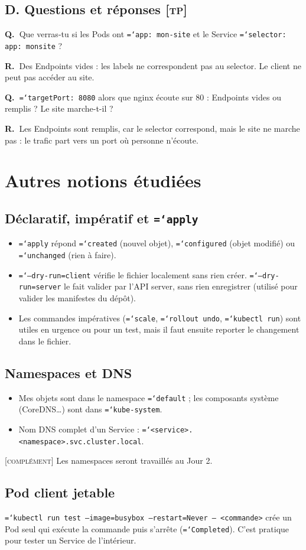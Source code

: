 \documentclass[11pt,a4paper]{article}
\newcommand{\cmd}[1]{\texttt{\hyphenchar\font=`\-#1}}
\newcommand{\tp}{\textsc{[tp]}}
\newcommand{\compl}{\textsc{[complément]}}
\newcommand{\QR}[2]{\needspace{4\baselineskip}\par\noindent\textbf{Q.~}#1\par\nopagebreak\noindent\textbf{R.~}#2\par\medskip}
\newcommand{\partie}[1]{\needspace{9\baselineskip}\subsection*{#1}}
\begin{document}
\partie{D. Questions et réponses \tp}
\QR{Que verras-tu si les Pods ont \cmd{app: mon-site} et le Service \cmd{selector: app: monsite} ?}{Des Endpoints vides : les labels ne correspondent pas au selector. Le client ne peut pas accéder au site.}
\QR{\cmd{targetPort: 8080} alors que nginx écoute sur 80 : Endpoints vides ou remplis ? Le site marche-t-il ?}{Les Endpoints sont remplis, car le selector correspond, mais le site ne marche pas : le trafic part vers un port où personne n'écoute.}

\section{Autres notions étudiées}

\subsection{Déclaratif, impératif et \cmd{apply}}
\begin{itemize}
  \item \cmd{apply} répond \cmd{created} (nouvel objet), \cmd{configured} (objet modifié) ou \cmd{unchanged} (rien à faire).
  \item \cmd{--dry-run=client} vérifie le fichier localement sans rien créer. \cmd{--dry-run=server} le fait valider par l'API server, sans rien enregistrer (utilisé pour valider les manifestes du dépôt).
  \item Les commandes impératives (\cmd{scale}, \cmd{rollout undo}, \cmd{kubectl run}) sont utiles en urgence ou pour un test, mais il faut ensuite reporter le changement dans le fichier.
\end{itemize}

\subsection{Namespaces et DNS}
\begin{itemize}
  \item Mes objets sont dans le namespace \cmd{default} ; les composants système (CoreDNS\ldots) sont dans \cmd{kube-system}.
  \item Nom DNS complet d'un Service : \cmd{<service>.<namespace>.svc.cluster.local}.
\end{itemize}
\compl{} Les namespaces seront travaillés au Jour 2.

\subsection{Pod client jetable}
\cmd{kubectl run test --image=busybox --restart=Never -- <commande>} crée un Pod seul qui exécute la commande puis s'arrête (\cmd{Completed}). C'est pratique pour tester un Service de l'intérieur.
\end{document}
